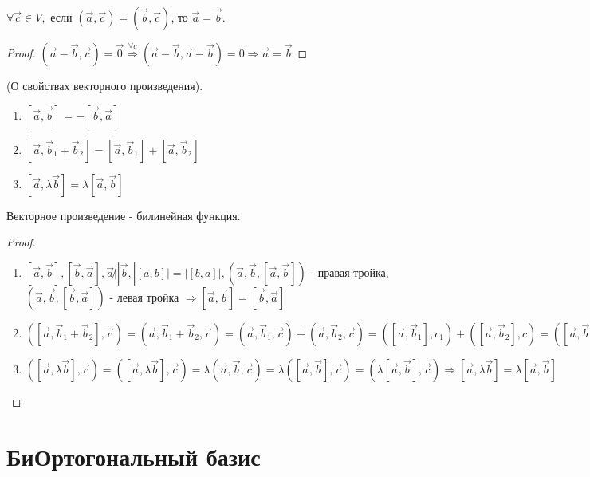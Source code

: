 \begin{lemma}
	\(\forall\vec c\in V, \text{ если } (\vec{a}, \vec{c}) = (\vec{b}, \vec{c})\), то $\vec{a} = \vec{b}$.
\end{lemma}
\begin{proof}
	\((\vec{a} - \vec{b}, \vec{c}) = \vec{0} \overset{\forall c}{\Longrightarrow} (\vec{a} - \vec{b}, \vec{a} - \vec{b}) = 0 \Longrightarrow \vec{a} = \vec{b}\)
\end{proof}
\begin{theorem}
	(О свойствах векторного произведения). 
	\begin{enumerate}
		\item  \([\vec a, \vec b] = - [\vec b, \vec a]\)
		\item \([\vec a, \vec b_1 + \vec b_2] = [\vec a, \vec b_1] + [\vec a, \vec b_2]\)
		\item \([\vec a, \lambda\vec b] = \lambda [\vec a, \vec b]\)
	\end{enumerate}
\end{theorem}
\begin{note}
	Векторное произведение - билинейная функция.
\end{note}
\begin{proof}
	\begin{enumerate}
		\item \([\vec a, \vec b], [\vec b, \vec a], \vec a \not||\vec b, |[a, b]| = |[b, a]|, (\vec a, \vec b, [\vec a, \vec b])\) - правая тройка, \((\vec a, \vec b, [\vec b, \vec a])\) - левая тройка $\Longrightarrow [\vec a, \vec b] = [\vec b, \vec a]$
		\item \(([\vec a, \vec b_1 + \vec b_2], \vec c) = (\vec a, \vec b_1 + \vec b_2, \vec c) = (\vec a, \vec b_1, \vec c) + (\vec a, \vec b_2, \vec c) = ([\vec a, \vec b_1], c_1) + ([\vec{a}, \vec b_2], c) = ([\vec a, \vec b_1] + [\vec a, \vec b_2], c) \Longrightarrow [\vec a, \vec b_1 + \vec b_2] = [\vec a, \vec b_1] + [\vec a, \vec b_2]\)
		\item \(([\vec a, \lambda \vec b], \vec c) = ([\vec a, \lambda\vec b], \vec c) = \lambda (\vec a, \vec b, \vec c) = \lambda ([\vec a, \vec b], \vec c) = (\lambda [\vec a, \vec b], \vec c) \Longrightarrow [\vec a, \lambda \vec b] = \lambda [\vec a, \vec b]\)
	\end{enumerate}
\end{proof}
\section{БиОртогональный базис}
